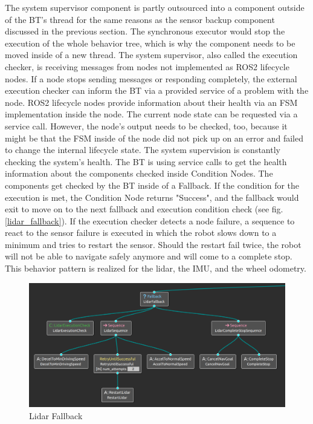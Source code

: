 The system supervisor component is partly outsourced into a component outside of the BT's thread for the same reasons as the sensor backup component discussed in the previous section. The synchronous executor would stop the execution of the whole behavior tree, which is why the component needs to be moved inside of a new thread. The system supervisor, also called the execution checker, is receiving messages from nodes not implemented as ROS2 lifecycle nodes. If a node stops sending messages or responding completely, the external execution checker can inform the BT via a provided service of a problem with the node. ROS2 lifecycle nodes provide information about their health via an FSM implementation inside the node. The current node state can be requested via a service call. However, the node's output needs to be checked, too, because it might be that the FSM inside of the node did not pick up on an error and failed to change the internal lifecycle state. 
The system supervision is constantly checking the system's health. The BT is using service calls to get the health information about the components checked inside Condition Nodes. 
The components get checked by the BT inside of a Fallback. If the condition for the execution is met, the Condition Node returns "Success", and the fallback would exit to move on to the next fallback and execution condition check (see fig. \ref{lidar_fallback}). If the execution checker detects a node failure, a sequence to react to the sensor failure is executed in which the robot slows down to a minimum and tries to restart the sensor. Should the restart fail twice, the robot will not be able to navigate safely anymore and will come to a complete stop. This behavior pattern is realized for the lidar, the IMU, and the wheel odometry. 
\begin{center}
\begin{figure}[ht]
	\includegraphics[width=1.0\textwidth]{images/sensor_fallback.png}
	\caption{Lidar Fallback}
	\label{fig:lidar_fallback}
\end{figure}
\end{center}


